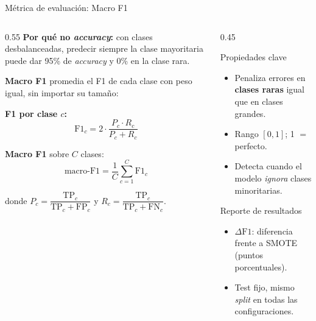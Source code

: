 \begin{frame}{Métrica de evaluación: Macro F1}
\begin{columns}[T]

\begin{column}{0.55\textwidth}
\small
\textbf{Por qué no \emph{accuracy}:}
con clases desbalanceadas, predecir siempre la clase mayoritaria puede dar 95\% de \emph{accuracy} y \alert{0\%} en la clase rara.

\vspace{0.3em}
\textbf{Macro F1} promedia el F1 de cada clase con \alert{peso igual}, sin importar su tamaño:

\vspace{0.1em}
{\small\textbf{F1 por clase $c$:}}
\vspace{-0.4em}
\[
\mathrm{F1}_c = 2 \cdot \frac{P_c \cdot R_c}{P_c + R_c}
\]

\vspace{-0.5em}
{\small\textbf{Macro F1} sobre $C$ clases:}
\vspace{-0.4em}
\[
\mathrm{macro\text{-}F1} = \frac{1}{C} \sum_{c=1}^{C} \mathrm{F1}_c
\]

\vspace{-0.3em}
{\scriptsize donde
$P_c = \dfrac{\mathrm{TP}_c}{\mathrm{TP}_c + \mathrm{FP}_c}$ \;y\;
$R_c = \dfrac{\mathrm{TP}_c}{\mathrm{TP}_c + \mathrm{FN}_c}$.}
\end{column}

\begin{column}{0.45\textwidth}
\begin{block}{\small Propiedades clave}
\scriptsize
\begin{itemize}\setlength\itemsep{1pt}
  \item Penaliza errores en \textbf{clases raras} igual que en clases grandes.
  \item Rango $[0,1]$; 1 $=$ perfecto.
  \item Detecta cuando el modelo \emph{ignora} clases minoritarias.
\end{itemize}
\end{block}

\vspace{0.4em}
\begin{block}{\small Reporte de resultados}
\scriptsize
\begin{itemize}\setlength\itemsep{1pt}
  \item $\Delta\mathrm{F1}$: diferencia frente a SMOTE (puntos porcentuales).
  \item Test fijo, mismo \emph{split} en todas las configuraciones.
\end{itemize}
\end{block}
\end{column}

\end{columns}

\end{frame}

